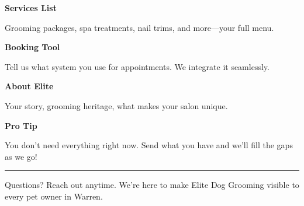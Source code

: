 \documentclass[11pt,letterpaper]{article}
\begin{document}
\begin{minipage}[t]{0.48\textwidth}
\begin{tcolorbox}[colframe=accent-teal, boxrule=1pt, left=0.7em, right=0.7em, top=0.5em, bottom=0.5em, arc=4pt, boxsep=0pt]
{\bfseries\small\color{accent-teal}Services List}

\vspace{0.15em}

{\small Grooming packages, spa treatments, nail trims, and more—your full menu.}
\end{tcolorbox}

\vspace{0.1em}

\begin{tcolorbox}[colframe=accent-teal, boxrule=1pt, left=0.7em, right=0.7em, top=0.5em, bottom=0.5em, arc=4pt, boxsep=0pt]
{\bfseries\small\color{accent-teal}Booking Tool}

\vspace{0.15em}

{\small Tell us what system you use for appointments. We integrate it seamlessly.}
\end{tcolorbox}

\vspace{0.1em}

\begin{tcolorbox}[colframe=accent-teal, boxrule=1pt, left=0.7em, right=0.7em, top=0.5em, bottom=0.5em, arc=4pt, boxsep=0pt]
{\bfseries\small\color{accent-teal}About Elite}

\vspace{0.15em}

{\small Your story, grooming heritage, what makes your salon unique.}
\end{tcolorbox}

\vspace{-0.2em}
\end{minipage}

\vspace{0.15em}

\begin{tcolorbox}[colback={accent-red!5}, colframe=accent-red!20, boxrule=0.5pt, left=0.7em, right=0.7em, top=0.4em, bottom=0.4em, arc=6pt, boxsep=0pt]

{\bfseries\small\color{accent-red}Pro Tip}

\vspace{0.1em}

{\small You don't need everything right now. Send what you have and we'll fill the gaps as we go!}

\end{tcolorbox}

\vspace{0.15em}

\noindent\hrule
\vspace{0.2em}

{\small\color{text-light}Questions? Reach out anytime. We're here to make Elite Dog Grooming visible to every pet owner in Warren.}
\end{document}
